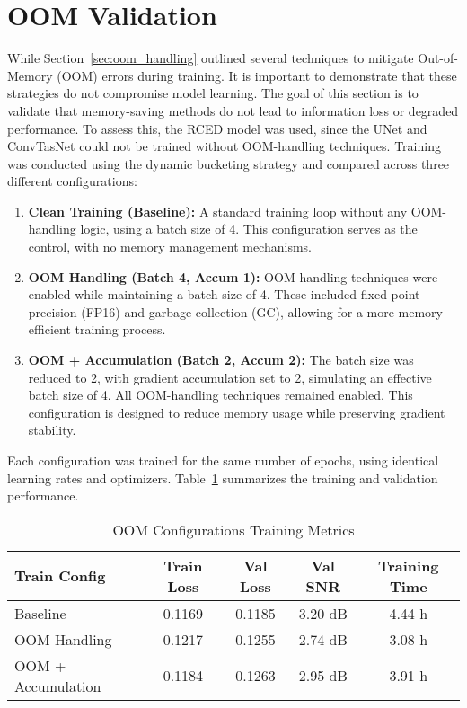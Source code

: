 \section{OOM Validation}
\label{sec:oom_validation}

While Section~\ref{sec:oom_handling} outlined several techniques to mitigate Out-of-Memory (OOM) errors during training. It is important to demonstrate that these strategies do not compromise model learning. The goal of this section is to validate that memory-saving methods do not lead to information loss or degraded performance. To assess this, the RCED model was used, since the UNet and ConvTasNet could not be trained without OOM-handling techniques. Training was conducted using the dynamic bucketing strategy and compared across three different configurations:

\begin{enumerate}
    \item \textbf{Clean Training (Baseline):} A standard training loop without any OOM-handling logic, using a batch size of 4. This configuration serves as the control, with no memory management mechanisms.
    
    \item \textbf{OOM Handling (Batch 4, Accum 1):} OOM-handling techniques were enabled while maintaining a batch size of 4. These included fixed-point precision (FP16) and garbage collection (GC), allowing for a more memory-efficient training process.
    
    \item \textbf{OOM + Accumulation (Batch 2, Accum 2):} The batch size was reduced to 2, with gradient accumulation set to 2, simulating an effective batch size of 4. All OOM-handling techniques remained enabled. This configuration is designed to reduce memory usage while preserving gradient stability.
\end{enumerate}

Each configuration was trained for the same number of epochs, using identical learning rates and optimizers. Table~\ref{tab:oom_training} summarizes the training and validation performance.

\vspace{1em}
\begin{table}[H]
\centering
\caption{OOM Configurations Training Metrics}
\label{tab:oom_training}
\begin{tabular}{|l|c|c|c|c|}
\hline
\textbf{Train Config} & \textbf{Train Loss} & \textbf{Val Loss} & \textbf{Val SNR} & \textbf{Training Time} \\
\hline
Baseline               & 0.1169 & 0.1185 & 3.20 dB & 4.44 h \\
OOM Handling           & 0.1217 & 0.1255 & 2.74 dB & 3.08 h \\
OOM + Accumulation     & 0.1184 & 0.1263 & 2.95 dB & 3.91 h \\
\hline
\end{tabular}
\end{table}

